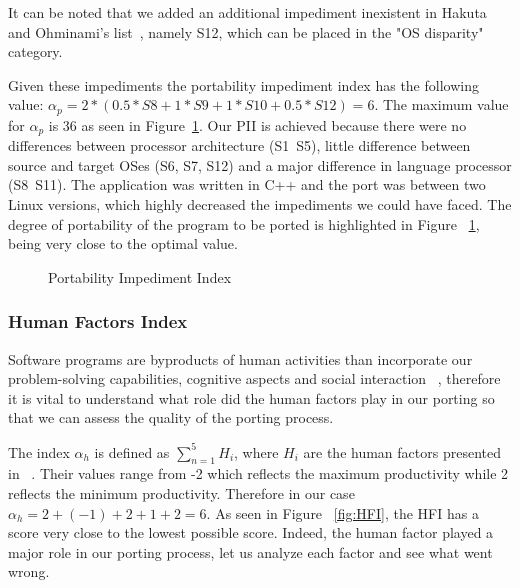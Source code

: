 It can be noted that we added an additional impediment inexistent in Hakuta and
Ohminami's list~\cite{b2}, namely S12, which can be placed in the "OS disparity"
category.

Given these impediments the portability impediment index has the following
value: $\alpha_p = 2 * (0.5 * S8 + 1 * S9 + 1 * S10 + 0.5 * S12) = 6$. The
maximum value for $\alpha_p$ is 36 as seen in Figure~\ref{fig:PII}. Our PII is
achieved because there were
no differences between processor architecture (S1~S5), little difference between
source and target OSes (S6, S7, S12) and a major difference in language processor
(S8~S11). The application was written in C++ and the port was between two Linux
versions, which highly decreased the impediments we could have faced. The
degree of portability of the program to be ported is highlighted in Figure
~\ref{fig:PII}, being very close to the optimal value.

\begin{figure}

    \caption{Portability Impediment Index}
    \label{fig:PII}
\end{figure}


\subsubsection{Human Factors Index}

Software programs are byproducts of human
activities than incorporate our problem-solving capabilities, cognitive aspects
and social interaction ~\cite{b3}, therefore it is vital to understand what role
did the human factors play in our porting so that we can assess the quality of
the porting process. 

The index $\alpha_h$ is defined as $\sum_{n=1}^{5} H_i$, where $H_i$ are the
human factors presented in ~\cite{b2}. Their values range from -2 which reflects
the maximum productivity while 2 reflects the minimum productivity. Therefore
in our case $\alpha_h = 2 + (-1) + 2 + 1 + 2 = 6$. As seen in Figure
~\ref{fig:HFI}, the HFI has a score very close to the lowest possible score.
Indeed, the human factor played a major role in our porting process, let us
analyze each factor and see what went wrong.

